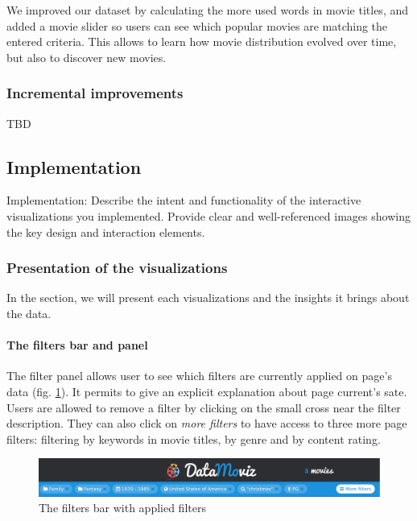 \documentclass[a4paper,10pt]{article}
\begin{document}
We improved our dataset by calculating the more used words in movie titles, and
added a movie slider so users can see which popular movies are matching the entered
criteria. This allows to learn how movie distribution evolved over time, but also
to discover new movies.

\subsubsection{Incremental improvements}

TBD

\subsection{Implementation}

Implementation: Describe the intent and functionality of the interactive visualizations you implemented. Provide clear and well-referenced images showing the key design and interaction elements.

\subsubsection{Presentation of the visualizations}

In the section, we will present each visualizations and the insights it brings about
the data.

\paragraph{The filters bar and panel} The filter panel allows user to see which filters are
currently applied on page's data (fig. \ref{fig:filters-bar}). It permits to give an explicit explanation about
page current's sate. Users are allowed to remove a filter by clicking on the small
cross near the filter description. They can also click on \textit{more filters} to
have access to three more page filters: filtering by keywords in movie titles,
by genre and by content rating.

\begin{figure}[ht]
  \centering
  \includegraphics[width=1\linewidth]{images/screens/filters-bar-example.png}
  \caption{The filters bar with applied filters} \label{fig:filters-bar}
\end{figure}
\end{document}
